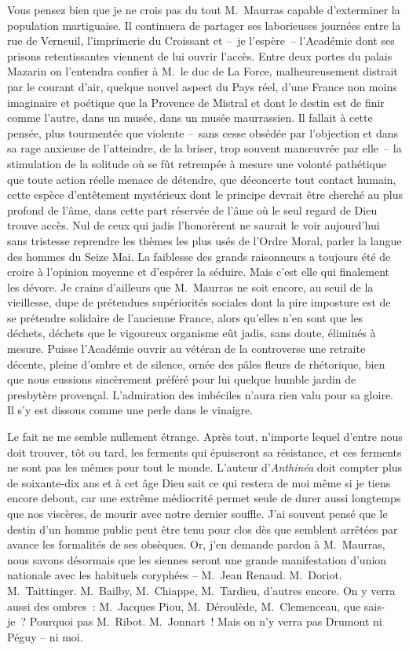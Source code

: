 \documentclass[french,twoside]{book} %
\begin{document}
\bigbreak
\noindent Vous pensez bien que je ne crois pas du tout M. Maurras capable d’exterminer la population martiguaise. Il continuera de partager ses laborieuses journées entre la rue de Verneuil, l’imprimerie du Croissant et – je l’espère – l’Académie dont ses prisons retentissantes viennent de lui ouvrir l’accès. Entre deux portes du palais Mazarin on l’entendra confier à M. le duc de La Force, malheureusement distrait par le courant d’air, quelque nouvel aspect du Pays réel, d’une France non moins imaginaire et poétique que la Provence de Mistral et dont le destin est de finir comme l’autre, dans un musée, dans un musée maurrassien. Il fallait à cette pensée, plus tourmentée que violente – sans cesse obsédée par l’objection et dans sa rage anxieuse de l’atteindre, de la briser, trop souvent manœuvrée par elle – la stimulation de la solitude où se fût retrempée à mesure une volonté pathétique que toute action réelle menace de détendre, que déconcerte tout contact humain, cette espèce d’entêtement mystérieux dont le principe devrait être cherché au plus profond de l’âme, dans cette part réservée de l’âme où le seul regard de Dieu trouve accès. Nul de ceux qui jadis l’honorèrent ne saurait le voir aujourd’hui sans tristesse reprendre les thèmes les plus usés de l’Ordre Moral, parler la langue des hommes du Seize Mai. La faiblesse des grands raisonneurs a toujours été de croire à l’opinion moyenne et d’espérer la séduire. Mais c’est elle qui finalement les dévore. Je crains d’ailleurs que M. Maurras ne soit encore, au seuil de la vieillesse, dupe de prétendues supériorités sociales dont la pire imposture est de se prétendre solidaire de l’ancienne France, alors qu’elles n’en sont que les déchets, déchets que le vigoureux organisme eût jadis, sans doute, éliminés à mesure. Puisse l’Académie ouvrir au vétéran de la controverse une retraite décente, pleine d’ombre et de silence, ornée des pâles fleurs de rhétorique, bien que nous eussions sincèrement préféré pour lui quelque humble jardin de presbytère provençal. L’admiration des imbéciles n’aura rien valu pour sa gloire. Il s’y est dissous comme une perle dans le vinaigre.\par
\bigbreak
\noindent Le fait ne me semble nullement étrange. Après tout, n’importe lequel d’entre nous doit trouver, tôt ou tard, les ferments qui épuiseront sa résistance, et ces ferments ne sont pas les mêmes pour tout le monde. L’auteur d’\emph{Anthinéa} doit compter plus de soixante-dix ans et à cet âge Dieu sait ce qui restera de moi même si je tiens encore debout, car une extrême médiocrité permet seule de durer aussi longtemps que nos viscères, de mourir avec notre dernier souffle. J’ai souvent pensé que le destin d’un homme public peut être tenu pour clos dès que semblent arrêtées par avance les formalités de ses obsèques. Or, j’en demande pardon à M. Maurras, nous savons désormais que les siennes seront une grande manifestation d’union nationale avec les habituels coryphées – M. Jean Renaud. M. Doriot. M. Taittinger. M. Bailby, M. Chiappe, M. Tardieu, d’autres encore. On y verra aussi des ombres : M. Jacques Piou, M. Déroulède, M. Clemenceau, que sais-je ? Pourquoi pas M. Ribot. M. Jonnart ! Mais on n’y verra pas Drumont ni Péguy – ni moi.\par
\end{document}
